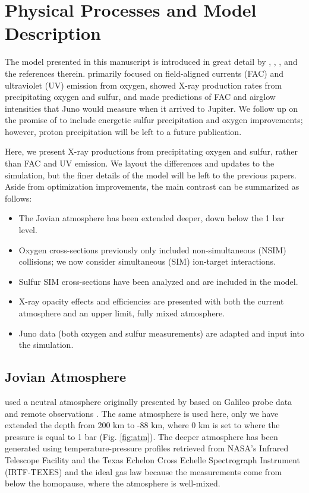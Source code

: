 \documentclass[draft]{agujournal2018}
\begin{document}
\section{Physical Processes and Model Description}

The model presented in this manuscript is introduced in great detail by \citet{houston2018}, \citet{ozak2010}, \citet{ozak2013}, and the references therein.
\citet{houston2018} primarily focused on field-aligned currents (FAC) and ultraviolet (UV) emission from oxygen, \citet{ozak2010} showed X-ray production rates from precipitating oxygen and sulfur, and \citet{ozak2013} made predictions of FAC and airglow intensities that Juno would measure when it arrived to Jupiter.
We follow up on the promise of \citet{houston2018} to include energetic sulfur precipitation and oxygen improvements; however, proton precipitation will be left to a future publication. 

Here, we present X-ray productions from precipitating oxygen and sulfur, rather than FAC and UV emission.
We layout the differences and updates to the simulation, but the finer details of the model will be left to the previous papers.
Aside from optimization improvements, the main contrast can be summarized as follows:
\begin{itemize}
\item The Jovian atmosphere has been extended deeper, down below the 1 bar level.
\item Oxygen cross-sections previously only included non-simultaneous (NSIM) collisions; we now consider simultaneous (SIM) ion-target interactions.
\item Sulfur SIM cross-sections have been analyzed and are included in the model.
\item X-ray opacity effects and efficiencies are presented with both the current atmosphere and an upper limit, fully mixed atmosphere.
\item Juno data (both oxygen and sulfur measurements) are adapted and input into the simulation.
\end{itemize}

\subsection{Jovian Atmosphere}
\label{sec:atm}

\citet{houston2018} used a neutral atmosphere originally presented by \citet{maurellis2001} based on Galileo probe data \citep{seiff1996,seiff1997} and remote observations \citep{sada1998}.
The same atmosphere is used here, only we have extended the depth from 200 km to -88 km, where 0 km is set to where the pressure is equal to 1 bar (Fig. \ref{fig:atm}).
The deeper atmosphere has been generated using temperature-pressure profiles retrieved from NASA's Infrared Telescope Facility and the Texas Echelon Cross Echelle Spectrograph Instrument (IRTF-TEXES) \citep{sinclair2018} and the ideal gas law because the measurements come from below the homopause, where the atmosphere is well-mixed.
\end{document}
